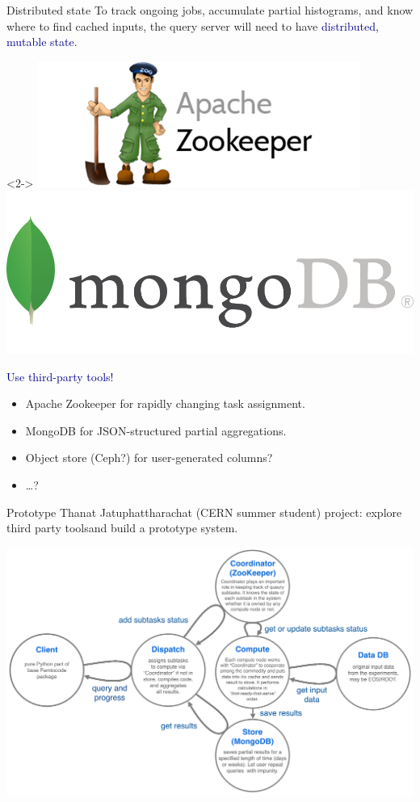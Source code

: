 \documentclass{beamer}
\begin{document}
\begin{frame}{Distributed state}
\vspace{0.5 cm}
To track ongoing jobs, accumulate partial histograms, and know where to find cached inputs, the query server will need to have \textcolor{darkblue}{distributed, mutable state}.

\vspace{0.3 cm}
\begin{uncoverenv}<2->
\hfill \includegraphics[height=1.2 cm]{zookeeper.png} \includegraphics[height=1.2 cm]{mongodb.png}

\vspace{-0.5 cm}
\textcolor{darkblue}{\large Use third-party tools!}
\begin{itemize}
\item Apache Zookeeper for rapidly changing task assignment.
\item MongoDB for JSON-structured partial aggregations.
\item Object store (Ceph?) for user-generated columns?
\item \ldots?
\end{itemize}
\end{uncoverenv}

\vspace{0.5 cm}
\end{frame}

\begin{frame}{Prototype}
\vspace{0.5 cm}
Thanat Jatuphattharachat (CERN summer student) project: explore third party tools\footnotemark[1] and build a prototype system\footnotemark[2].

\begin{center}
\includegraphics[width=0.75\linewidth]{distributed-layout.png}
\end{center}

\end{frame}
\end{document}
